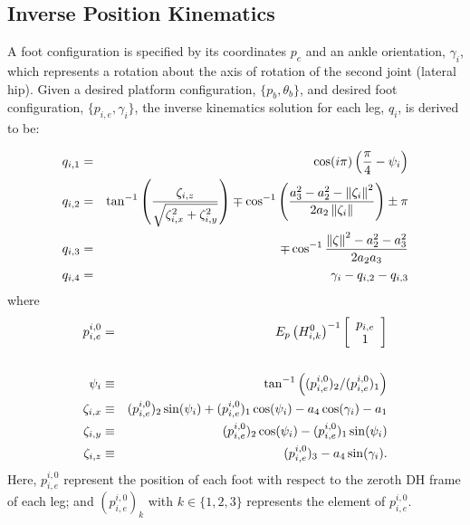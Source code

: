 		\subsection{Inverse Position Kinematics}
			\label{sec::inverse_position_kinematics}
			
			A foot configuration is specified by its coordinates ${p}_{e}$ and an ankle orientation, $\gamma_{i}$,  which represents a rotation about the axis of rotation of the second joint (lateral hip). Given a desired platform configuration, $\{ {p}_{b}, \theta_{b} \}$,  and desired \Ith foot configuration,  $\{ {p}_{i,e} , \gamma_{i} \}$, the inverse kinematics solution for each \Ith leg, ${q}_{i}$, is derived to be:

				\begin{eqnarray}
					q_{i,1} &=& \cos(i\pi) \left( \frac{\pi}{4} - \psi_{i} \right) \nonumber\\
					q_{i,2} &=&	\tan^{-1} \left(\frac{\zeta_{i,z}}{\sqrt{\zeta_{i,x}^2+\zeta_{i,y}^2}}\right) \mp \cos^{-1}\left(\frac{a_{3}^2-a_{2}^2-\left\lVert\zeta_{i}\right\rVert^2}{2 a_{2} \left\lVert\zeta_{i}\right\rVert }\right) \pm \pi 	\nonumber\\
					q_{i,3} &=&	\mp \cos^{-1}\frac{\left\lVert\zeta\right\rVert^2-a_{2}^2-a_{3}^2}{2 a_{2} a_{3}} \nonumber\\
					q_{i,4} &=&	\gamma_{i} - q_{i,2} - q_{i,3}	
				\end{eqnarray}
				where
				\begin{eqnarray}
					{p}_{i,e}^{i,0} &=&
					E_{p} 
					\left( {H}_{i,k}^{0} \right) ^{-1}
					\left[
						\begin{array}{c}
							{p}_{i,e} 		\\
							1 				\\ 	
						\end{array}
					\right]	\nonumber\\																						\nonumber\\
					\psi_{i} 	&\equiv&	\tan^{-1}\left( ({p}_{i,e}^{i,0})_{2}/({p}_{i,e}^{i,0})_{1} \right)												\nonumber\\
					\zeta_{i,x} &\equiv& 	({p}_{i,e}^{i,0})_{2} \sin(\psi_{i}) + ({p}_{i,e}^{i,0})_{1} \cos(\psi_{i}) - a_{4} \cos(\gamma_{i}) - a_{1} 						\nonumber\\
					\zeta_{i,y} &\equiv& 	({p}_{i,e}^{i,0})_{2} \cos(\psi_{i}) - ({p}_{i,e}^{i,0})_{1} \sin(\psi_{i}) 											\nonumber\\
					\zeta_{i,z}	&\equiv&  	({p}_{i,e}^{i,0})_{3} - a_{4} \sin(\gamma_{i}) .
				\end{eqnarray}
			Here, ${p}_{i,e}^{i,0}$ represent the position of each \Ith foot with respect to the zeroth DH frame of each \Ith leg; and $({p}_{i,e}^{i,0})_{k}$ with $k\in\{1,2,3\}$ represents the \Kth element of ${p}_{i,e}^{i,0}$.

